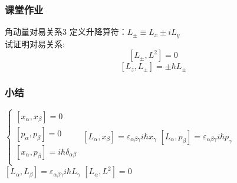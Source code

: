 \begin{frame} 
    \frametitle{课堂作业}
    \begin{tcolorbox2}{角动量对易关系3}
     定义升降算符：$L_\pm \equiv L_x \pm i L_y$ \\
     试证明对易关系:  $$[L_\pm,L^2]=0$$
     $$[L_z, L_\pm]= \pm \hbar L_\pm $$
    \end{tcolorbox2}
\end{frame} 


\begin{frame} 
    \frametitle{小结}
    \begin{tcolorbox4}[常见对易关系]
        \begin{enumerate}
            \Item $\begin{cases}
                [x_\alpha,x_\beta]= 0  \\ 
                [p_\alpha,p_\beta]= 0  \\ 
                [x_\alpha,p_\beta]= i\hbar \delta_{\alpha\beta}  \\ 
                \end{cases}$
            \Item $ [L_\alpha,x_\beta]= \varepsilon_{\alpha\beta\gamma} i\hbar x_\gamma $
            \Item $ [L_\alpha,p_\beta]= \varepsilon_{\alpha\beta\gamma} i\hbar p_\gamma $
            \Item $ [L_\alpha,L_\beta]= \varepsilon_{\alpha\beta\gamma} i\hbar L_\gamma $
            \Item $ [L_\alpha,L^2]= 0 $
        \end{enumerate}
    \end{tcolorbox4}
\end{frame} 
